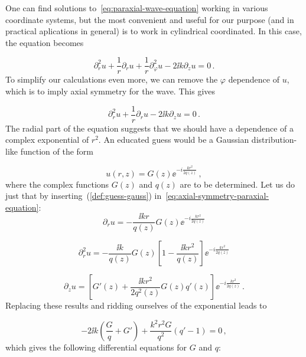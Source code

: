\documentclass[12pt, class=report, crop=false]{standalone}
\begin{document}
One can find solutions to~\cref{eq:paraxial-wave-equation} working in various coordinate systems, but the most convenient and useful for our purpose (and in practical aplications in general) is to work in cylindrical coordinated. In this case, the equation becomes

\begin{equation}
  \partial_r^2 u +\frac{1}{r} \partial_r u + \frac{1}{r} \partial_\varphi^2 u - 2 \ii k \partial_z u = 0 \,.
\end{equation}
To simplify our calculations even more, we can remove the \(\varphi\) dependence of \(u\), which is to imply axial symmetry for the wave. This gives

\begin{equation}
  \label{eq:axial-symmetry-paraxial-equation}
  \partial_r^2 u +\frac{1}{r} \partial_r u- 2 \ii k \partial_z u = 0 \,.
\end{equation}
The radial part of the equation suggests that we should have a dependence of a complex exponential of \(r^2\). An educated guess would be a Gaussian distribution-like function of the form

\begin{equation}
  \label{def:guess-gauss}
  u(r,z) = G(z) \ee^{-i\frac{kr^2}{2q(z)}} \,,
\end{equation}
where the complex functions \(G(z)\) and \(q(z)\) are to be determined. Let us do just that by inserting~(\ref{def:guess-gauss}) in~\cref{eq:axial-symmetry-paraxial-equation}:
\begin{equation*}
  \partial_r u = - \frac{\ii k r}{q(z)}G(z) \ee^{-i\frac{kr^2}{2q(z)}}
\end{equation*}

\begin{equation*}
  \partial_r^2 u =- \frac{\ii k}{q(z)}G(z) \left[1 - \frac{\ii k r^2}{q(z)} \right]\ee^{-i\frac{kr^2}{2q(z)}}
\end{equation*}

\begin{equation*}
  \partial_z u = \left[G'(z) + \frac{\ii k r^2}{2 q^2 (z)} G(z) q'(z)\right] \ee^{-i\frac{kr^2}{2q(z)}} \,.
\end{equation*}
Replacing these results and ridding ourselves of the exponential leads to

\begin{equation}
  -2 \ii k \left(\frac{G}{q} + G' \right) + \frac{k^2 r^2 G}{q^2} (q'-1) = 0\,,
\end{equation}
which gives the following differential equations for \(G\) and \(q\):
\end{document}
